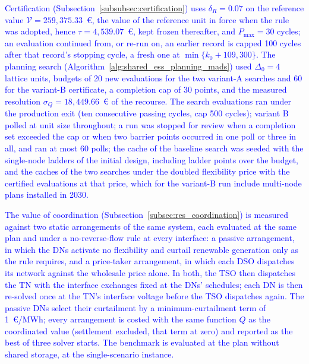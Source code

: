 \documentclass[preprint,12pt]{elsarticle}
\begin{document}
\textcolor{blue}{
    Certification (Subsection~\ref{subsubsec:certification}) uses $\delta_R = 0.07$ on the reference value $\mathcal{V} = 259{,}375.33$~\euro{}, the value of the reference unit in force when the rule was adopted, hence $\tau = 4{,}539.07$~\euro{}, kept frozen thereafter, and $P_{\max} = 30$ cycles;
    an evaluation continued from, or re-run on, an earlier record is capped 100 cycles after that record's stopping cycle, a fresh one at $\min\{k_0 + 109, 300\}$. The planning search (Algorithm~\ref{alg:shared_ess_planning_mads}) used $\Delta_0 = 4$ lattice units, budgets of 20 new evaluations for the two variant-A searches and 60 for the variant-B certificate, a completion cap of 30 points, and the measured resolution $\sigma_Q = 18{,}449.66$~\euro{} of the recourse.
    The search evaluations ran under the production exit (ten consecutive passing cycles, cap 500 cycles); variant B polled at unit size throughout; a run was stopped for review when a completion set exceeded the cap or when two barrier points occurred in one poll or three in all, and ran at most 60 polls; the cache of the baseline search was seeded with the single-node ladders of the initial design, including ladder points over the budget, and the caches of the two searches under the doubled flexibility price with the certified evaluations at that price, which for the variant-B run include multi-node plans installed in 2030.
}

\textcolor{blue}{
    The value of coordination (Subsection~\ref{subsec:res_coordination}) is measured against two static arrangements of the same system, each evaluated at the same plan and under a no-reverse-flow rule at every interface: a passive arrangement, in which the DNs activate no flexibility and curtail renewable generation only as the rule requires, and a price-taker arrangement, in which each DSO dispatches its network against the wholesale price alone. 
    In both, the TSO then dispatches the TN with the interface exchanges fixed at the DNs' schedules; each DN is then re-solved once at the TN's interface voltage before the TSO dispatches again. The passive DNs select their curtailment by a minimum-curtailment term of 1~\euro/MWh; every arrangement is costed with the same function $Q$ as the coordinated value (settlement excluded, that term at zero) and reported as the best of three solver starts. The benchmark is evaluated at the plan without shared storage, at the single-scenario instance.
}

\end{document}
